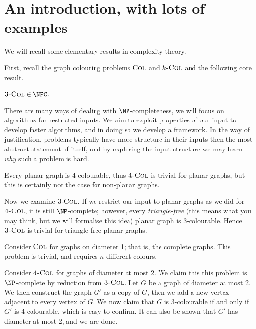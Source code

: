 \section{An introduction, with lots of examples}

We will recall some elementary results in complexity theory. 

First, recall the graph colouring problems $\text{\normalfont \textsc{Col}}$ and $\text{\normalfont \textsc{$k$-Col}}$ and the following core result.

\begin{theorem}
  $\mathsc{3-Col} \in \NPC$.
\end{theorem}

There are many ways of dealing with $\NP$-completeness, we will focus on algorithms for restricted inputs. We aim to exploit properties of our input to develop faster algorithms, and in doing so we develop a framework. In the way of justification, problems typically have more structure in their inputs then the most abstract statement of itself, and by exploring the input structure we may learn \emph{why} such a problem is hard.

\begin{example}
  Every planar graph is $4$-colourable, thus $\text{\normalfont \textsc{4-Col}}$ is trivial for planar graphs, but this is certainly not the case for non-planar graphs. 
\end{example}

\begin{example}
  Now we examine $\text{\normalfont \textsc{3-Col}}$. If we restrict our input to planar graphs as we did for $\text{\normalfont \textsc{4-Col}}$, it is still $\NP$-complete; however, every \emph{triangle-free} (this means what you may think, but we will formalise this idea) planar graph is $3$-colourable. Hence $\text{\normalfont \textsc{3-Col}}$ is trivial for triangle-free planar graphs. 
\end{example}

\begin{example}
  Consider $\text{\normalfont \textsc{Col}}$ for graphs on diameter 1; that is, the complete graphs. This problem is trivial, and requires $n$ different colours.
\end{example}

\begin{example}
  Consider $\text{\normalfont \textsc{4-Col}}$ for graphs of diameter at most 2. We claim this this problem is $\NP$-complete by reduction from $\text{\normalfont \textsc{3-Col}}$. Let $G$ be a graph of diameter at most 2. We then construct the graph $G'$ as a copy of $G$, then we add a new vertex adjacent to every vertex of $G$. We now claim that $G$ is $3$-colourable if and only if $G'$ is $4$-colourable, which is easy to confirm. It can also be shown that $G'$ has diameter at most 2, and we are done.
\end{example}

